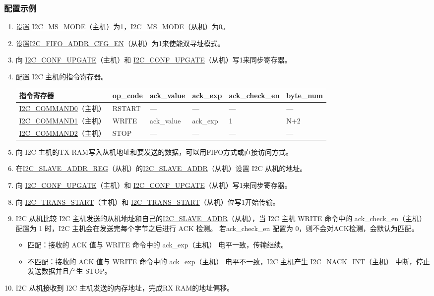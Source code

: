 \documentclass[main\_\_CN.tex]{subfiles}
\begin{document}
\subsubsection{配置示例}
\begin{enumerate}
\item 设置 \hyperref[fielddesc:I2CMSMODE]{I2C\_MS\_MODE}（主机）为1，\hyperref[fielddesc:I2CMSMODE]{I2C\_MS\_MODE}（从机）为0。
\item 设置\hyperref[fielddesc:I2CFIFOADDRCFGEN]{I2C\_FIFO\_ADDR\_CFG\_EN}（从机）为1来使能双寻址模式。
\item 向 \hyperref[fielddesc:I2CCONFUPGATE]{I2C\_CONF\_UPGATE}（主机）和 \hyperref[fielddesc:I2CCONFUPGATE]{I2C\_CONF\_UPGATE}（从机）写1来同步寄存器。
\item 配置 I2C 主机的指令寄存器。
\begin{longtable}{ | p{4cm} | p{2cm} | p{2cm} | p{2cm} |p{2cm} | p{2cm} |}
\hline\rowcolor{lightgray}
指令寄存器& op\_code & ack\_value&ack\_exp&ack\_check\_en&byte\_num  \\ \hline
\hyperref[fielddesc:I2CCOMMAND0]{I2C\_COMMAND0}（主机）& RSTART& ---&---&---&---  \\ \hline
\hyperref[fielddesc:I2CCOMMAND1]{I2C\_COMMAND1}（主机）& WRITE& ack\_value&ack\_exp&1&N+2  \\ \hline
\hyperref[fielddesc:I2CCOMMAND2]{I2C\_COMMAND2}（主机）& STOP& ---&---&---&---  \\ \hline
\end{longtable}
\item 向 I2C 主机的TX RAM写入从机地址和要发送的数据，可以用FIFO方式或直接访问方式。
\item 在\hyperref[regdesc:I2CSLAVEADDRREG]{I2C\_SLAVE\_ADDR\_REG}（从机）的\hyperref[fielddesc:I2CSLAVEADDR]{I2C\_SLAVE\_ADDR}（从机）设置 I2C 从机的地址。
\item 向 \hyperref[fielddesc:I2CCONFUPGATE]{I2C\_CONF\_UPGATE}（主机）和 \hyperref[fielddesc:I2CCONFUPGATE]{I2C\_CONF\_UPGATE}（从机）写1来同步寄存器。
\item 向 \hyperref[fielddesc:I2CTRANSSTART]{I2C\_TRANS\_START}（主机）和 \hyperref[fielddesc:I2CTRANSSTART]{I2C\_TRANS\_START}（从机）位写1开始传输。
\item I2C 从机比较 I2C 主机发送的从机地址和自己的\hyperref[fielddesc:I2CSLAVEADDR]{I2C\_SLAVE\_ADDR}（从机），当 I2C 主机 WRITE 命令中的 ack\_check\_en（主机） 配置为 1 时，I2C 主机会在发送完每个字节之后进行 ACK 检测。 若ack\_check\_en 配置为 0，则不会对ACK检测，会默认为匹配。
\begin{itemize}
\item 匹配：接收的 ACK 值与 WRITE 命令中的 ack\_exp（主机） 电平一致，传输继续。
\item 不匹配：接收的 ACK 值与 WRITE 命令中的 ack\_exp（主机） 电平不一致，I2C 主机产生 I2C\_NACK\_INT（主机） 中断，停止发送数据并且产生 STOP。
\end{itemize}
\item I2C 从机接收到 I2C 主机发送的内存地址，完成RX RAM的地址偏移。


\end{enumerate}
\end{document}
